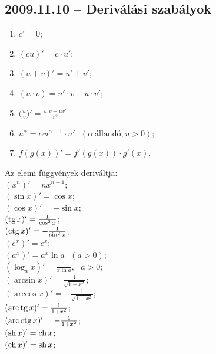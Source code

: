 \subsection*{2009.11.10 -- Deriválási szabályok}
\begin{enumerate}
\item $c'=0$;
\item $(cu)'=c\cdot u'$;
\item $(u+v)'=u'+v'$;
\item $(u\cdot v)= u'\cdot v + u\cdot v'$;
\item $\big(\frac{u}{v}\big)'=\frac{u'v-uv'}{v^2}$
\item $u^\alpha = \alpha u^{\alpha-1}\cdot u' ~~~(\alpha~\text{állandó,}~u>0) $;
\item $f(g(x))'=f'(g(x))\cdot g'(x)$.
\end{enumerate}
Az elemi függvények deriváltja:\\
$(x^n)'=nx^{n-1}$;\\
$(\sin x)'=\cos x $;\\
$(\cos x)'=-\sin x $;\\
$(\mathop{\mathrm{tg}}\nolimits x)'=\frac{1}{\cos^2 x} $;\\
$(\mathop{\mathrm{ctg}}\nolimits x)'=-\frac{1}{\sin^2 x} $;\\
$(e^x)'=e^x $;\\
$(a^x)'=a^x \ln a~~~(a>0) $;\\
$(\log_a x)'=\frac{1}{x \ln a},~~~a>0 $;\\
$(\arcsin x)'=\frac{1}{\sqrt{1-x^2}} $;\\
$(\arccos x)'=-\frac{1}{\sqrt{1-x^2}}$;\\
$(\mathop{\mathrm{arc}}\nolimits\mathop{\mathrm{tg}}\nolimits x)'=\frac{1}{1+x^2} $;\\
$(\mathop{\mathrm{arc}}\nolimits\mathop{\mathrm{ctg}}\nolimits x)'=-\frac{1}{1+x^2} $;\\
$(\mathop{\mathrm{sh}}\nolimits x)'=\mathop{\mathrm{ch}}\nolimits x $;\\
$(\mathop{\mathrm{ch}}\nolimits x)'=\mathop{\mathrm{sh}}\nolimits x $;\\



